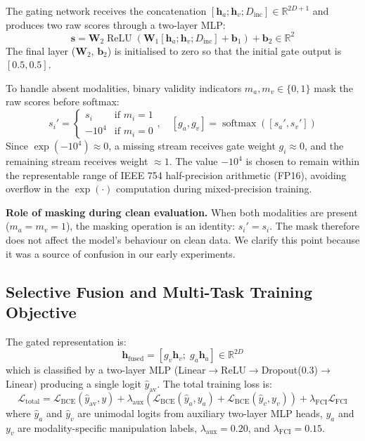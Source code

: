 \documentclass[conference]{IEEEtran}
\begin{document}
The gating network receives the concatenation $[\mathbf{h}_a; \mathbf{h}_v; D_{\mathrm{inc}}] \in \mathbb{R}^{2D + 1}$ and produces two raw scores through a two-layer MLP:
\begin{equation}
\mathbf{s} = \mathbf{W}_2 \operatorname{ReLU}(\mathbf{W}_1 [\mathbf{h}_a; \mathbf{h}_v; D_{\mathrm{inc}}] + \mathbf{b}_1) + \mathbf{b}_2 \in \mathbb{R}^2
\end{equation}
The final layer ($\mathbf{W}_2$, $\mathbf{b}_2$) is initialised to zero so that the initial gate output is $[0.5, 0.5]$.

To handle absent modalities, binary validity indicators $m_a, m_v \in \{0, 1\}$ mask the raw scores before softmax:
\begin{equation}
s_i' = \begin{cases} s_i & \text{if } m_i = 1 \\ -10^4 & \text{if } m_i = 0 \end{cases}, \quad [g_a, g_v] = \operatorname{softmax}([s_a', s_v'])
\end{equation}
Since $\exp(-10^4) \approx 0$, a missing stream receives gate weight $g_i \approx 0$, and the remaining stream receives weight $\approx 1$. The value $-10^4$ is chosen to remain within the representable range of IEEE 754 half-precision arithmetic (FP16), avoiding overflow in the $\exp(\cdot)$ computation during mixed-precision training.

\textbf{Role of masking during clean evaluation.} When both modalities are present ($m_a = m_v = 1$), the masking operation is an identity: $s_i' = s_i$. The mask therefore does not affect the model's behaviour on clean data. We clarify this point because it was a source of confusion in our early experiments.

\subsection{Selective Fusion and Multi-Task Training Objective}

The gated representation is:
\begin{equation}
\mathbf{h}_{\mathrm{fused}} = [g_v \mathbf{h}_v; \; g_a \mathbf{h}_a] \in \mathbb{R}^{2D}
\end{equation}
which is classified by a two-layer MLP (Linear$\rightarrow$ReLU$\rightarrow$Dropout(0.3)$\rightarrow$Linear) producing a single logit $\hat{y}_{\mathrm{av}}$. The total training loss is:
\begin{equation}
\mathcal{L}_{\mathrm{total}} = \mathcal{L}_{\mathrm{BCE}}(\hat{y}_{\mathrm{av}}, y) + \lambda_{\mathrm{aux}}(\mathcal{L}_{\mathrm{BCE}}(\hat{y}_a, y_a) + \mathcal{L}_{\mathrm{BCE}}(\hat{y}_v, y_v)) + \lambda_{\mathrm{FCI}} \mathcal{L}_{\mathrm{FCI}}
\end{equation}
where $\hat{y}_a$ and $\hat{y}_v$ are unimodal logits from auxiliary two-layer MLP heads, $y_a$ and $y_v$ are modality-specific manipulation labels, $\lambda_{\mathrm{aux}} = 0.20$, and $\lambda_{\mathrm{FCI}} = 0.15$.
\end{document}
